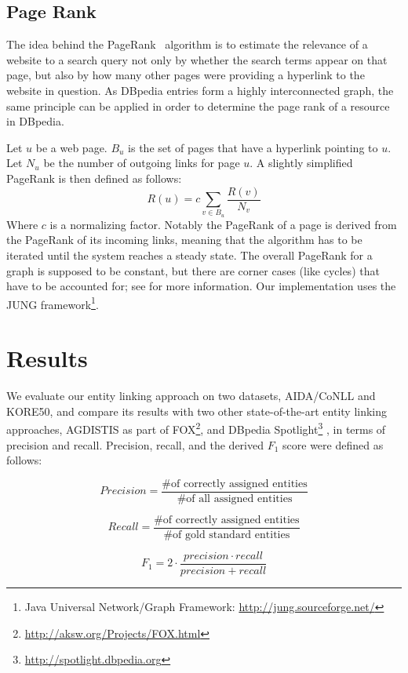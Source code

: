 \documentclass[runningheads,a4paper]{llncs}
\begin{document}
{%
\subsection{Page Rank}

The idea behind the PageRank~\cite{pageRank} algorithm is to estimate the relevance of a website to a search query not only by whether the search terms appear on that page, but also by how many other pages were providing a hyperlink to the website in question. As DBpedia entries form a highly interconnected graph, the same principle can be applied in order to determine the page rank of a resource in DBpedia.

Let $u$ be a web page. $B_u$ is the set of pages that have a hyperlink pointing to $u$. Let $N_u$ be the number of outgoing links for page $u$. A slightly simplified PageRank is then defined as follows: 
$$R(u) = c \sum_{v \in B_u} \frac{R(v)}{N_v}$$
Where $c$ is a normalizing factor. Notably the PageRank of a page is derived from the PageRank of its incoming links, meaning that the algorithm has to be iterated until the system reaches a steady state. The overall PageRank for a graph is supposed to be constant, but there are corner cases (like cycles) that have to be accounted for; see \cite{pageRank} for more information. Our implementation uses the JUNG framework\footnote{Java Universal Network/Graph Framework: \url{http://jung.sourceforge.net/}}.

\section{Results}\label{sec:results}

We evaluate our entity linking approach on two datasets, AIDA/CoNLL and KORE50, and compare its results with two other state-of-the-art entity linking approaches, AGDISTIS \cite{agdistis} as part of FOX\footnote{\url{http://aksw.org/Projects/FOX.html}}, and DBpedia Spotlight\footnote{\url{http://spotlight.dbpedia.org}} \cite{spotlight},  
in terms of precision and recall. Precision, recall, and the derived $F_1$ score were defined as follows:

$$Precision = \frac{\text{\# of correctly assigned entities}}{\text{\# of all assigned entities}}$$

$$Recall = \frac{\text{\# of correctly assigned entities}}{\text{\# of gold standard entities}}$$

$$F_1 = 2 \cdot \frac{precision \cdot recall}{precision + recall}$$

}
\end{document}
